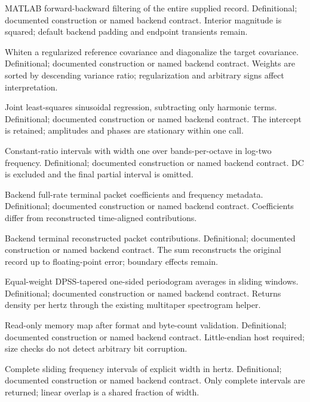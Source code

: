 {MATLAB forward-backward filtering of the entire supplied record.}
{Definitional; documented construction or named backend contract.}
{Interior magnitude is squared; default backend padding and endpoint transients remain.}

{Whiten a regularized reference covariance and diagonalize the target covariance.}
{Definitional; documented construction or named backend contract.}
{Weights are sorted by descending variance ratio; regularization and arbitrary signs affect interpretation.}

{Joint least-squares sinusoidal regression, subtracting only harmonic terms.}
{Definitional; documented construction or named backend contract.}
{The intercept is retained; amplitudes and phases are stationary within one call.}

{Constant-ratio intervals with width one over bands-per-octave in log-two frequency.}
{Definitional; documented construction or named backend contract.}
{DC is excluded and the final partial interval is omitted.}

{Backend full-rate terminal packet coefficients and frequency metadata.}
{Definitional; documented construction or named backend contract.}
{Coefficients differ from reconstructed time-aligned contributions.}

{Backend terminal reconstructed packet contributions.}
{Definitional; documented construction or named backend contract.}
{The sum reconstructs the original record up to floating-point error; boundary effects remain.}

{Equal-weight DPSS-tapered one-sided periodogram averages in sliding windows.}
{Definitional; documented construction or named backend contract.}
{Returns density per hertz through the existing multitaper spectrogram helper.}

{Read-only memory map after format and byte-count validation.}
{Definitional; documented construction or named backend contract.}
{Little-endian host required; size checks do not detect arbitrary bit corruption.}

{Complete sliding frequency intervals of explicit width in hertz.}
{Definitional; documented construction or named backend contract.}
{Only complete intervals are returned; linear overlap is a shared fraction of width.}

